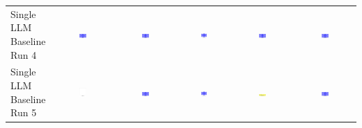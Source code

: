 \begin{table}
\begin{tabular}{@{}lccccc@{}}
    \makecell{Single LLM \\ Baseline \\ Run 4} & \includegraphics[width=0.13\textwidth]{./run_4/png/gpt-4o_results/BasicLayout.png} & \includegraphics[width=0.13\textwidth]{./run_4/png/o1-preview_results/BasicLayout.png} & \includegraphics[width=0.13\textwidth]{./run_4/png/claude-3-5-sonnet-20240620_results/BasicLayout.png} & \includegraphics[width=0.13\textwidth]{./run_4/png/watsonx_meta-llama_llama-3-1-70b-instruct_results/BasicLayout.png} & \includegraphics[width=0.13\textwidth]{./run_4/png/watsonx_meta-llama_llama-3-405b-instruct_results/BasicLayout.png} \\
    \makecell{Single LLM \\ Baseline \\ Run 5} & \includegraphics[width=0.13\textwidth]{./run_5/png/gpt-4o_results/BasicLayout.png} & \includegraphics[width=0.13\textwidth]{./run_5/png/o1-preview_results/BasicLayout.png} & \includegraphics[width=0.13\textwidth]{./run_5/png/claude-3-5-sonnet-20240620_results/BasicLayout.png} & \includegraphics[width=0.13\textwidth]{./run_5/png/watsonx_meta-llama_llama-3-1-70b-instruct_results/BasicLayout.png} & \includegraphics[width=0.13\textwidth]{./run_5/png/watsonx_meta-llama_llama-3-405b-instruct_results/BasicLayout.png} \\

\end{tabular}
\end{table}

